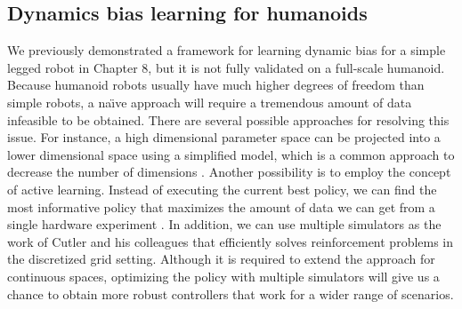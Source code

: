 \subsection{Dynamics bias learning for humanoids} 

We previously demonstrated a framework for learning dynamic bias
for a simple legged robot in Chapter 8, but it is not fully validated on a
full-scale humanoid.
Because humanoid robots usually have much higher degrees of freedom than simple
robots, 
a na\"{\i}ve approach will require
a tremendous amount of data infeasible to be obtained.
There are several possible approaches for resolving this issue.
For instance, a high dimensional parameter space can be projected into a lower
dimensional space using a simplified model, which is a common approach to
decrease the number of dimensions \cite{bib-humanoid13-trajectory}.
Another possibility is to employ the concept of active learning.
Instead of executing the current best policy, we can find the most
informative policy that maximizes the amount of data we can get from a
single hardware experiment \cite{DaSilva:2014:ACP}.
In addition, we can use multiple simulators as the work of Cutler and his
colleagues \cite{bib-icra14-reinforcement} that efficiently solves reinforcement
problems in the discretized grid setting. 
Although it is required to extend the approach for continuous spaces,
optimizing the policy with multiple simulators will give us a chance to obtain
more robust controllers that work for a wider range of scenarios.














